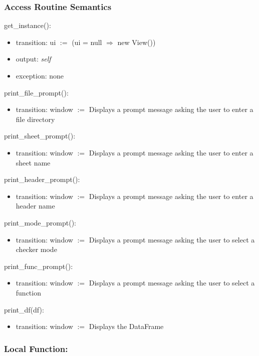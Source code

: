 \documentclass[12pt]{article}
\begin{document}
\subsubsection* {Access Routine Semantics}

\noindent get\_instance():
\begin{itemize}
\item transition: ui $:=$ (ui = null $\Rightarrow$ new View())
\item output: \textit{self}
\item exception: none
\end{itemize}

\noindent print\_file\_prompt():
\begin{itemize}
\item transition: window $:=$ Displays a prompt message asking the user to enter a file directory
\end{itemize}

\noindent print\_sheet\_prompt():
\begin{itemize}
\item transition: window $:=$ Displays a prompt message asking the user to enter a sheet name
\end{itemize}

\noindent print\_header\_prompt():
\begin{itemize}
\item transition: window $:=$ Displays a prompt message asking the user to enter a header name
\end{itemize}

\noindent print\_mode\_prompt():
\begin{itemize}
\item transition: window $:=$ Displays a prompt message asking the user to select a checker mode
\end{itemize}

\noindent print\_func\_prompt():
\begin{itemize}
\item transition: window $:=$ Displays a prompt message asking the user to select a function
\end{itemize}

\noindent print\_df(df):
\begin{itemize}
\item transition: window $:=$ Displays the DataFrame
\end{itemize}

\subsubsection*{Local Function:}
\end{document}
